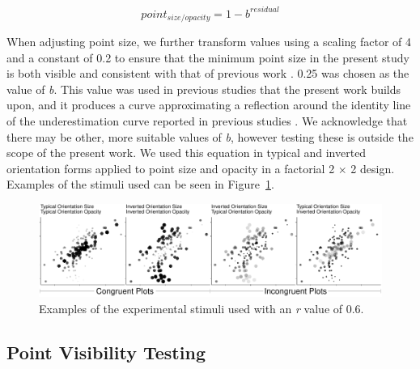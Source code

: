 \documentclass[sigconf]{acmart}
\begin{document}
\begin{equation}
  point_{size/opacity} = 1 - b^{residual}
\end{equation}

When adjusting point size, we further transform values using a scaling
factor of 4 and a constant of 0.2 to ensure that the minimum point size
in the present study is both visible and consistent with that of
previous work \citep{strain_2023, strain_2023b}. 0.25 was chosen as the
value of \emph{b}. This value was used in previous studies that the
present work builds upon, and it produces a curve approximating a
reflection around the identity line of the underestimation curve
reported in previous studies
\citep{rensink_2017, strain_2023, strain_2023b}. We acknowledge that
there may be other, more suitable values of \emph{b}, however testing
these is outside the scope of the present work. We used this equation in
typical and inverted orientation forms applied to point size and opacity
in a factorial 2 \(\times\) 2 design. Examples of the stimuli used can
be seen in Figure~\ref{fig-examples}.

\begin{figure}

\includegraphics[width=1\textwidth,height=\textheight]{size_and_opacity_files/figure-pdf/fig-examples-1.pdf} \hfill{}

\caption{\label{fig-examples}Examples of the experimental stimuli used
with an \textit{r} value of 0.6.}

\end{figure}

\hypertarget{sec-VT}{%
\subsection{Point Visibility Testing}\label{sec-VT}}
\end{document}
